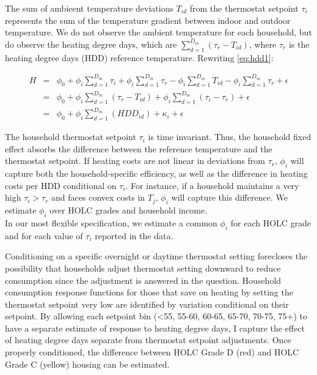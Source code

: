 \documentclass[
]{article}
\begin{document}
The sum of ambieent temperature deviations \(T_{id}\) from the
thermostat setpoint \(\tau_i\) represents the sum of the temperature
gradient between indoor and outdoor temperature. We do not observe the
ambient temperature for each household, but do observe the heating
degree days, which are \(\sum_{d=1}^{D_m}(\tau_r - T_{id})\), where
\(\tau_r\) is the heating degree days (HDD) reference temperature.
Rewriting \ref{eq:hdd1}:

\begin{eqnarray}
H &=& \phi_0 + \phi_i \sum_{d=1}^{D_m}\tau_i + \phi_i \sum_{d=1}^{D_m} \tau_r - \phi_i \sum_{d=1}^{D_m} T_{id} - \phi_i \sum_{d=1}^{D_m} \tau_r + \epsilon \nonumber \\
 &=& \phi_0 + \phi_i \sum_{d=1}^{D_m}(\tau_r - T_{id}) + \phi_i \sum_{d=1}^{D_m}(\tau_i-\tau_r) + \epsilon \nonumber \\
 &=& \phi_0 + \phi_i \sum_{d=1}^{D_m}(HDD_{id}) + \kappa_{i} + \epsilon \label{eq:hdd2}
\end{eqnarray}

The household thermostat setpoint \(\tau_i\) is time invariant. Thus,
the household fixed effect absorbs the difference between the reference
temperature and the thermostat setpoint. If heating costs are not linear
in deviations from \(\tau_r\), \(\phi_i\) will capture both the
household-specific efficiency, as well as the difference in heating
costs per HDD conditional on \(\tau_i\). For instance, if a household
maintains a very high \(\tau_i>\tau_r\) and faces convex costs in
\(T_j\), \(\phi_i\) will capture this difference. We estimate \(\phi_i\)
over HOLC grades and household income.\\
In our most flexible specification, we estimate a common \(\phi_i\) for
each HOLC grade and for each value of \(\tau_i\) reported in the data.

Conditioning on a specific overnight or daytime thermostat setting
forecloses the possibility that households adjust thermostat setting
downward to reduce consumption since the adjustment is answered in the
question. Household consumption response functions for those that save
on heating by setting the thermostat setpoint very low are identified by
variation conditional on their setpoint. By allowing each setpoint bin
(\textless55, 55-60, 60-65, 65-70, 70-75, 75+) to have a separate
estimate of response to heating degree days, I capture the effect of
heating degree days separate from thermostat setpoint adjustments. Once
properly conditioned, the difference between HOLC Grade D (red) and HOLC
Grade C (yellow) housing can be estimated.
\end{document}
